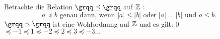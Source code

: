 
%

%
%
\begin{bsp}
Betrachte die Relation $\grqq\preceq \grqq $ auf $\mathbb{Z}$ :  
\[a \preceq b \text{ genau dann, wenn } |a| \le |b| \text{ oder }  |a| = |b| \text{ und } a \leq  b.\]
 $\grqq\preceq \grqq $ ist eine Wohlordnung auf $\mathbb{Z}$ und es gilt: 0$  \preceq -1 \preceq 1 \preceq -2 \preceq 2 \preceq 3 \preceq -3 ... $ 
\end{bsp}
%

%
 
